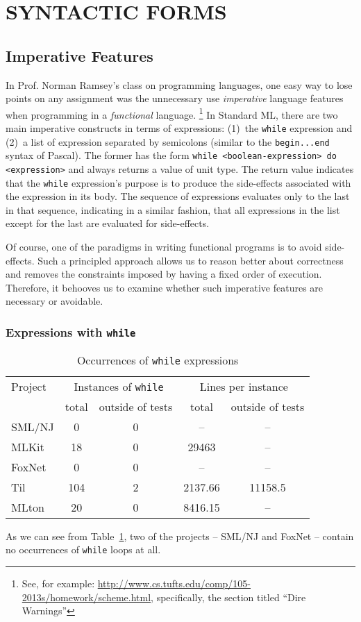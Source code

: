 \documentclass[12pt,abstracton]{scrartcl}
\begin{document}
\section{SYNTACTIC FORMS}\label{sec:syntax}
\subsection{Imperative Features}\label{subsec:imper}
In Prof. Norman Ramsey's class on programming languages, one easy way to lose points
on any assignment was the unnecessary use \emph{imperative} language features when programming in a \emph{functional} language.
\footnote{See, for example: \url{http://www.cs.tufts.edu/comp/105-2013s/homework/scheme.html}, specifically, the section titled ``Dire Warnings''}
In Standard ML, there are two main imperative constructs in terms of expressions:
(1)~the \texttt{while} expression and (2)~a list of expression separated by semicolons (similar to the \texttt{begin...end} syntax of Pascal)\cite{Ull98}.
The former has the form \texttt{while <boolean-expression> do <expression>} and always returns a value of unit type.
The return value indicates that the \texttt{while} expression's purpose is to produce the side-effects associated
with the expression in its body. The sequence of expressions evaluates only to the last in that sequence, indicating
in a similar fashion, that all expressions in the list except for the last are evaluated for side-effects.

Of course, one of the paradigms in writing functional programs is to avoid side-effects.
Such a principled approach allows us to reason better about correctness and
removes the constraints imposed by having a fixed order of execution.\cite{Hug90} Therefore,
it behooves us to examine whether such imperative features are necessary or avoidable.
\subsubsection{Expressions with \texttt{while}}
\begin{table}[h!]
\centering
\begin{tabular}{|l||c|c||c|c|}
\hline
Project & \multicolumn{2}{c||}{Instances of \texttt{while}} & \multicolumn{2}{c|}{Lines per instance} \\ \cline{2-3}\cline{4-5}
 & total & outside of tests & total & outside of tests \\ \hline\hline
SML/NJ & 0 & 0 & -- & --\\ 
MLKit & 18 & 0 & 29463 & --\\
FoxNet & 0 & 0 & -- & -- \\
Til & 104 & 2 & 2137.66 & 11158.5 \\
MLton & 20 & 0 & 8416.15 & --\\ \hline
\end{tabular}
\caption{Occurrences of \texttt{while} expressions}
\label{table:while}
\end{table}
As we can see from Table~\ref{table:while}, two of the projects -- SML/NJ and FoxNet -- contain no occurrences
of \texttt{while} loops at all.
\end{document}
